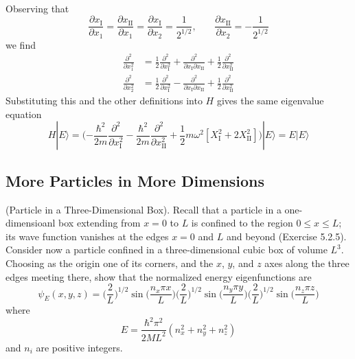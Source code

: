 \documentclass[../principles-of-quantum-mechanics.tex]{subfiles}
\begin{document}
\begin{questions}
\begin{solution}
\begin{align*}
			 \end{align*}
		 	Observing that
		 	$$\frac{\partial x_\text{I}}{\partial x_1} = \frac{\partial x_\text{II}}{\partial x_1} = \frac{\partial x_\text{I}}{\partial x_2} =  \frac{1}{2^{1/2}}\text{,}\qquad\frac{\partial x_\text{II}}{\partial x_2} = {-\frac{1}{2^{1/2}}}$$
		 	we find
		 	\begin{align*}
		 		\frac{\partial^2}{\partial x_1^2} &= \frac{1}{2}\frac{\partial^2}{\partial x_\text{I}^2} + \frac{\partial^2}{\partial x_\text{I}\partial x_\text{II}} + \frac{1}{2}\frac{\partial ^2}{\partial x_\text{II}^2} \\
		 		\frac{\partial^2}{\partial x_2^2} &= \frac{1}{2}\frac{\partial^2}{\partial x_\text{I}^2} - \frac{\partial^2}{\partial x_\text{I}\partial x_\text{II}} + \frac{1}{2}\frac{\partial^2}{\partial x_\text{II}^2}
		 	\end{align*}
	 		Substituting this and the other definitions into $H$ gives the same eigenvalue equation
	 		$$H|E\rangle = \Big({-\frac{\hbar^2}{2m}\frac{\partial^2}{\partial x_\text{I}^2}} - \frac{\hbar^2}{2m}\frac{\partial^2}{\partial x_\text{II}^2} + \frac{1}{2}m\omega^2[X_\text{I}^2 + 2X_\text{II}^2]\Big)|E\rangle = E|E\rangle$$
		\end{solution}
		
		\setcounter{subsection}{1}
		\setcounter{question}{0}
		\subsection{More Particles in More Dimensions}
		
		\question (Particle in a Three-Dimensional Box). Recall that a particle in a one-dimensioanl box extending from $x=0$ to $L$ is confined to the region $0 \leq x \leq L$; its wave function vanishes at the edges $x = 0$ and $L$ and beyond (Exercise 5.2.5). Consider now a particle confined in a three-dimensional cubic box of volume $L^3$. Choosing as the origin one of its corners, and the $x$, $y$, and $z$ axes along the three edges meeting there, show that the normalized energy eigenfunctions are
		$$\psi_E(x, y, z) = \Big(\frac{2}{L}\Big)^{1/2}\sin\Big(\frac{n_x\pi x}{L}\Big)\Big(\frac{2}{L}\Big)^{1/2}\sin\Big(\frac{n_y\pi y}{L}\Big)\Big(\frac{2}{L}\Big)^{1/2}\sin\Big(\frac{n_z\pi z}{L}\Big)$$
		where
		$$E = \frac{\hbar^2\pi^2}{2ML^2}(n_x^2 + n_y^2 + n_z^2)$$
		and $n_i$ are positive integers.
		

\end{questions}
\end{document}

